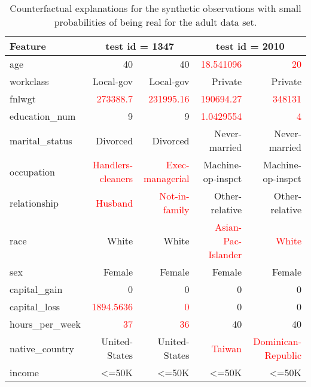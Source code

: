 \begin{table}[ht]
\centering
\begin{tabular}{|l|rr|rr|}
  \toprule
  Feature& \multicolumn{2}{c|}{ test id = 1347}& \multicolumn{2}{c|}{ test id = 2010}\\ \midrule
age & 40 & 40 & \textcolor{red}{18.541096} & \textcolor{red}{20} \\ 
  workclass & Local-gov & Local-gov & Private & Private \\ 
  fnlwgt & \textcolor{red}{273388.7} & \textcolor{red}{231995.16} & \textcolor{red}{190694.27} & \textcolor{red}{348131} \\ 
  education\_num & 9 & 9 & \textcolor{red}{1.0429554} & \textcolor{red}{4} \\ 
  marital\_status & Divorced & Divorced & Never-married & Never-married \\ 
  occupation & \textcolor{red}{Handlers-cleaners} & \textcolor{red}{Exec-managerial} & Machine-op-inspct & Machine-op-inspct \\ 
  relationship & \textcolor{red}{Husband} & \textcolor{red}{Not-in-family} & Other-relative & Other-relative \\ 
  race & White & White & \textcolor{red}{Asian-Pac-Islander} & \textcolor{red}{White} \\ 
  sex & Female & Female & Female & Female \\ 
  capital\_gain & 0 & 0 & 0 & 0 \\ 
  capital\_loss & \textcolor{red}{1894.5636} & \textcolor{red}{0} & 0 & 0 \\ 
  hours\_per\_week & \textcolor{red}{37} & \textcolor{red}{36} & 40 & 40 \\ 
  native\_country & United-States & United-States & \textcolor{red}{Taiwan} & \textcolor{red}{Dominican-Republic} \\ 
  income & <=50K & <=50K & <=50K & <=50K \\ 
   \bottomrule
\end{tabular}
\caption{Counterfactual explanations for the synthetic observations with small probabilities of being real for the adult data set.} 
\end{table}
